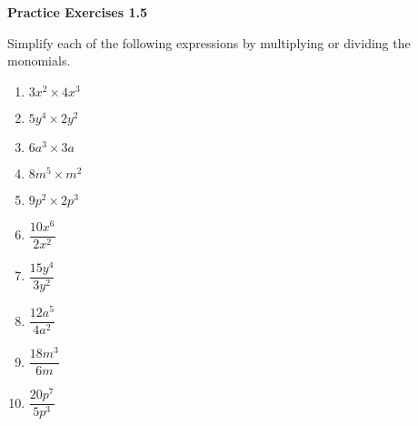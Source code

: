 \vspace{1ex}
\noindent\textbf{Practice Exercises 1.5}

\vspace{0.75ex}

Simplify each of the following expressions by multiplying or dividing the monomials.
\begin{multicols}{4}
\begin{enumerate}
    \item \( 3x^2 \times 4x^3 \)
    \item \( 5y^4 \times 2y^2 \)
    \item \( 6a^3 \times 3a \)
    \item \( 8m^5 \times m^2 \)
    \item \( 9p^2 \times 2p^3 \)
    \item \( \dfrac{10x^6}{2x^2} \)
    \item \( \dfrac{15y^4}{3y^2} \)
    \item \( \dfrac{12a^5}{4a^2} \)
    \item \( \dfrac{18m^3}{6m} \)
    \item \( \dfrac{20p^7}{5p^3} \)
\end{enumerate}
\end{multicols} 